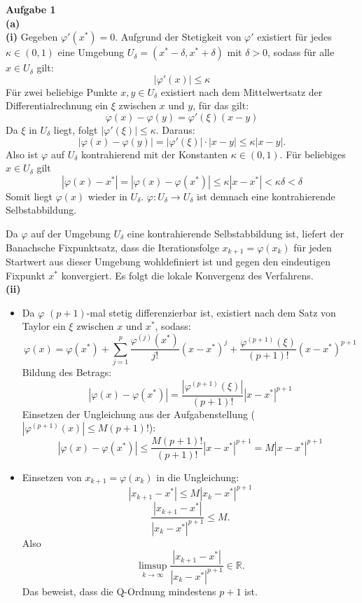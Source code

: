 \documentclass[a4paper,12pt]{article}
\begin{document}
\raggedright
\doublespacing
\noindent\textbf{Aufgabe 1} \\
\noindent\textbf{(a)\\(i)} Gegeben $\varphi'(x^*) = 0$. Aufgrund der Stetigkeit von $\varphi'$ existiert für jedes $\kappa \in (0, 1)$ eine Umgebung $U_\delta = (x^* - \delta, x^* + \delta)$ mit $\delta > 0$, sodass für alle $x \in U_\delta$ gilt:$$|\varphi'(x)| \le \kappa$$
Für zwei beliebige Punkte $x, y \in U_\delta$ existiert nach dem Mittelwertsatz der Differentialrechnung ein $\xi$ zwischen $x$ und $y$, für das gilt:$$\varphi(x) - \varphi(y) = \varphi'(\xi)(x - y)$$
Da  $\xi$ in $U_\delta$ liegt, folgt $|\varphi'(\xi)| \le \kappa$. Daraus:
$$|\varphi(x) - \varphi(y)| = |\varphi'(\xi)| \cdot |x - y| \le \kappa |x - y|.$$
Also ist $\varphi$ auf $U_\delta$ kontrahierend mit der Konstanten $\kappa \in (0, 1)$.
Für beliebiges $x \in U_{\delta}$ gilt
$$|\varphi(x) - x^*| = |\varphi(x) - \varphi(x^*)| \le \kappa |x - x^*| < \kappa \delta < \delta$$
 Somit liegt $\varphi(x)$ wieder in $U_\delta$. $\varphi: U_\delta \to U_\delta$ ist demnach eine kontrahierende Selbstabbildung. \\
 \bigskip
 
 Da $\varphi$ auf der Umgebung $U_\delta$ eine kontrahierende Selbstabbildung ist, liefert der Banachsche Fixpunktsatz, dass die Iterationsfolge $x_{k+1} = \varphi(x_k)$ für jeden Startwert aus dieser Umgebung wohldefiniert ist und gegen den eindeutigen Fixpunkt $x^*$ konvergiert. Es folgt die lokale Konvergenz des Verfahrens. \\
 \bigskip
 \noindent\textbf{(ii)} 
\begin{itemize}
  \item Da $\varphi$ $(p+1)$-mal stetig differenzierbar ist, existiert nach dem Satz von Taylor ein $\xi$ zwischen $x$ und $x^*$, sodass:$$\varphi(x) = \varphi(x^*) + \sum_{j=1}^{p} \frac{\varphi^{(j)}(x^*)}{j!} (x - x^*)^j + \frac{\varphi^{(p+1)}(\xi)}{(p+1)!} (x - x^*)^{p+1}$$
  Bildung des Betrags:
  $$|\varphi(x) - \varphi(x^*)| = \frac{|\varphi^{(p+1)}(\xi)|}{(p+1)!} |x - x^*|^{p+1}$$
  Einsetzen der Ungleichung aus der Aufgabenstellung ($|\varphi^{(p+1)}(x)| \le M(p+1)!$):
  $$\boxed{|\varphi(x) - \varphi(x^*)| \le \frac{M(p+1)!}{(p+1)!} |x - x^*|^{p+1} = M |x - x^*|^{p+1}}$$

  \item Einsetzen von   $x_{k+1} = \varphi(x_k)$ in die Ungleichung:
$$|x_{k+1} - x^*| \le M |x_k - x^*|^{p+1}$$
$$\frac{|x_{k+1} - x^*|}{|x_k - x^*|^{p+1}} \le M.$$
Also
$$\limsup_{k \to \infty} \frac{|x_{k+1} - x^*|}{|x_k - x^*|^{p+1}} \in \mathbb{R}.$$
Das beweist, dass die Q-Ordnung mindestens $p+1$ ist.
\end{itemize}
\end{document}
